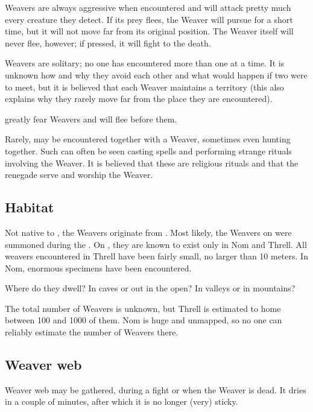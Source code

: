 Weavers are always aggressive when encountered and will attack pretty much every creature they detect. If its prey flees, the Weaver will pursue for a short time, but it will not move far from its original position. The Weaver itself will never flee, however; if pressed, it will fight to the death. 

Weavers are solitary; no one has encountered more than one at a time. It is unknown how and why they avoid each other and what would happen if two were to meet, but it is believed that each Weaver maintains a territory (this also explains why they rarely move far from the place they are encountered). 

\Banes{} greatly fear Weavers and will flee before them. 

Rarely, \banes{} may be encountered together with a Weaver, sometimes even hunting together. Such \banes{} can often be seen casting spells and performing strange rituals involving the Weaver. It is believed that these are religious rituals and that the renegade \banes{} serve and worship the Weaver. %









\subsection{Habitat}
Not native to \Miith{}, the Weavers originate from \Erebos. Most likely, the Weavers on \Miith{} were summoned during the \banewar. On \Miith{}, they are known to exist only in Nom and Threll. All weavers encountered in Threll have been fairly small, no larger than 10 meters. In Nom, enormous specimens have been encountered. 

Where do they dwell? In caves or out in the open? In valleys or in mountains? 

The total number of Weavers is unknown, but Threll is estimated to home between 100 and 1000 of them. Nom is huge and unmapped, so no one can reliably estimate the number of Weavers there. 







\subsection{Weaver web}
Weaver web may be gathered, during a fight or when the Weaver is dead. It dries in a couple of minutes, after which it is no longer (very) sticky. 

